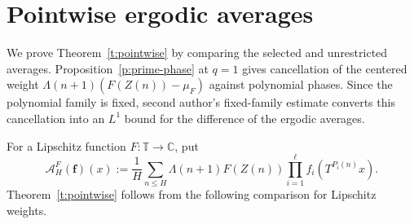 \documentclass[12pt]{amsart}
\newcommand{\1}{\mathbf 1}
\newtheorem{theorem}{Theorem}[section]
\theoremstyle{definition}
\begin{document}


\section{Pointwise ergodic averages}\label{s:ergodic}

We prove Theorem~\ref{t:pointwise} by comparing the selected and
unrestricted averages. Proposition~\ref{p:prime-phase} at \(q=1\)
gives cancellation of the centered weight
\(\Lambda(n+1)(F(Z(n))-\mu_F)\) against polynomial phases.
Since the polynomial family is fixed, %
second author's
fixed-family estimate converts this cancellation into an
\(L^1\) bound for the difference of the ergodic averages.

For a Lipschitz function \(F:\mathbb T\to\mathbb C\), put
\[
 \mathcal A_H^F(\mathbf f)(x)
 :=\frac1H\sum_{n\le H}\Lambda(n+1)F(Z(n))
       \prod_{i=1}^{\ell} f_i(T^{P_i(n)}x).
\]
Theorem~\ref{t:pointwise} follows from the following comparison for
Lipschitz weights.
\end{document}
